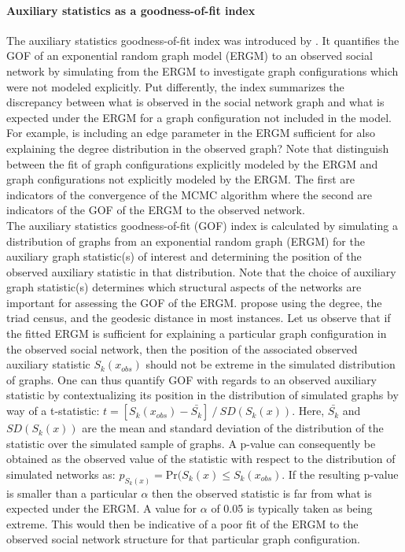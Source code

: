 \documentclass[a4paper, man, floatsintext]{apa6}
\begin{document}
\paragraph{Auxiliary statistics as a goodness-of-fit index}
The auxiliary statistics goodness-of-fit index was introduced by . It quantifies the GOF of an exponential random graph model (ERGM) to an observed social network by simulating from the ERGM to investigate graph configurations which were not modeled explicitly. Put differently, the index summarizes the discrepancy between what is observed in the social network graph and what is expected under the ERGM for a graph configuration not included in the model. For example, is including an edge parameter in the ERGM sufficient for also explaining the degree distribution in the observed graph? Note that  distinguish between the fit of graph configurations explicitly modeled by the ERGM and graph configurations not explicitly modeled by the ERGM. The first are indicators of the convergence of the MCMC algorithm where the second are indicators of the GOF of the ERGM to the observed network.  
\\
The auxiliary statistics goodness-of-fit (GOF) index is calculated by simulating a distribution of graphs from an exponential random graph (ERGM) for the auxiliary graph statistic(s) of interest and determining the position of the observed auxiliary statistic in that distribution. Note that the choice of auxiliary graph statistic(s) determines which structural aspects of the networks are important for assessing the GOF of the ERGM.  propose using the degree, the triad census, and the geodesic distance in most instances. Let us observe that if the fitted ERGM is sufficient for explaining a particular graph configuration in the observed social network, then the position of the associated observed auxiliary statistic $S_{k}(x_{obs})$ should not be extreme in the simulated distribution of graphs. \clearpage \noindent One can thus quantify GOF with regards to an observed auxiliary statistic by contextualizing its position in the distribution of simulated graphs by way of a t-statistic: $t = [S_{k}(x_{obs}) − \bar{S_{k}}] \ / \ SD(S_{k}(x))$. Here, $\bar{S_{k}}$ and $SD(S_{k}(x))$ are the mean and standard deviation of the distribution of the statistic over the simulated sample of graphs. A p-value can consequently be obtained as the observed value of the statistic with respect to the distribution of simulated networks as: $p_{S_{k}(x)} = \text{Pr}(S_{k}(x) \leq S_{k}(x_{obs})$. If the resulting p-value is smaller than a particular $\alpha$ then the observed statistic is far from what is expected under the ERGM. A value for $\alpha$ of 0.05 is typically taken as being extreme. This would then be indicative of a poor fit of the ERGM to the observed social network structure for that particular graph configuration. 
\\
\end{document}
